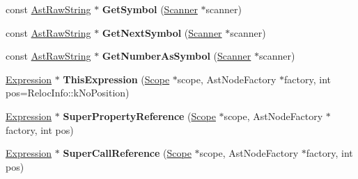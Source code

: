 \begin{DoxyCompactItemize}
\item 
const \hyperlink{classv8_1_1internal_1_1_ast_raw_string}{Ast\+Raw\+String} $\ast$ {\bfseries Get\+Symbol} (\hyperlink{classv8_1_1internal_1_1_scanner}{Scanner} $\ast$scanner)\hypertarget{classv8_1_1internal_1_1_parser_traits_a1d7b04ddff6eacc8ab04512ea3fe31b5}{}\label{classv8_1_1internal_1_1_parser_traits_a1d7b04ddff6eacc8ab04512ea3fe31b5}

\item 
const \hyperlink{classv8_1_1internal_1_1_ast_raw_string}{Ast\+Raw\+String} $\ast$ {\bfseries Get\+Next\+Symbol} (\hyperlink{classv8_1_1internal_1_1_scanner}{Scanner} $\ast$scanner)\hypertarget{classv8_1_1internal_1_1_parser_traits_a56c2c6fcc416e624da608f611cb22821}{}\label{classv8_1_1internal_1_1_parser_traits_a56c2c6fcc416e624da608f611cb22821}

\item 
const \hyperlink{classv8_1_1internal_1_1_ast_raw_string}{Ast\+Raw\+String} $\ast$ {\bfseries Get\+Number\+As\+Symbol} (\hyperlink{classv8_1_1internal_1_1_scanner}{Scanner} $\ast$scanner)\hypertarget{classv8_1_1internal_1_1_parser_traits_ab56e4ceb78a7000cd4285c2feb824ade}{}\label{classv8_1_1internal_1_1_parser_traits_ab56e4ceb78a7000cd4285c2feb824ade}

\item 
\hyperlink{classv8_1_1internal_1_1_expression}{Expression} $\ast$ {\bfseries This\+Expression} (\hyperlink{classv8_1_1internal_1_1_scope}{Scope} $\ast$scope, Ast\+Node\+Factory $\ast$factory, int pos=Reloc\+Info\+::k\+No\+Position)\hypertarget{classv8_1_1internal_1_1_parser_traits_af3766589dab2e966849f3e3cc70dda25}{}\label{classv8_1_1internal_1_1_parser_traits_af3766589dab2e966849f3e3cc70dda25}

\item 
\hyperlink{classv8_1_1internal_1_1_expression}{Expression} $\ast$ {\bfseries Super\+Property\+Reference} (\hyperlink{classv8_1_1internal_1_1_scope}{Scope} $\ast$scope, Ast\+Node\+Factory $\ast$factory, int pos)\hypertarget{classv8_1_1internal_1_1_parser_traits_a8c16722c60e2f1c98a8d5276e0da5db2}{}\label{classv8_1_1internal_1_1_parser_traits_a8c16722c60e2f1c98a8d5276e0da5db2}

\item 
\hyperlink{classv8_1_1internal_1_1_expression}{Expression} $\ast$ {\bfseries Super\+Call\+Reference} (\hyperlink{classv8_1_1internal_1_1_scope}{Scope} $\ast$scope, Ast\+Node\+Factory $\ast$factory, int pos)\hypertarget{classv8_1_1internal_1_1_parser_traits_a4fb2f1841ae64e8257d6883643631375}{}\label{classv8_1_1internal_1_1_parser_traits_a4fb2f1841ae64e8257d6883643631375}


\end{DoxyCompactItemize}
